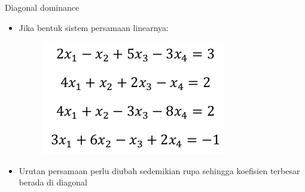 \documentclass[pdflatex,compress,mathserif]{beamer}
\begin{document}
\begin{frame}{Diagonal dominance}
    \begin{itemize}
        \item Jika bentuk sistem persamaan linearnya:
        \begin{figure}
            \includegraphics[width=0.5\linewidth]{./img/img05.png}
        \end{figure}
        \item Urutan persamaan perlu diubah sedemikian rupa sehingga koefisien terbesar berada di diagonal
    \end{itemize}
\end{frame}
\end{document}
